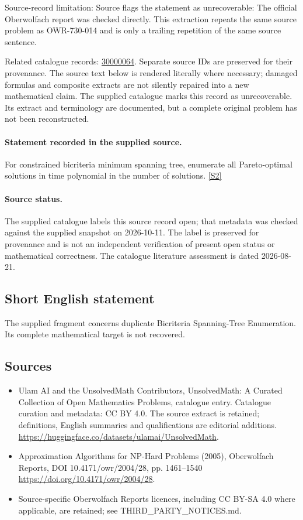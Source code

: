 \documentclass[11pt]{article}
\begin{document}
Source-record limitation: Source flags the statement as unrecoverable: The official Oberwolfach report was checked directly. This extraction repeats the same source problem as OWR-730-014 and is only a trailing repetition of the same source sentence.

Related catalogue records: \href{https://mehmetmars7.github.io/Erdosproblems-llm-hunter/problem.html?type=open_problems&id=30000064}{30000064}. Separate source IDs are preserved for their provenance.
The source text below is rendered literally where necessary; damaged formulas and composite extracts are not silently repaired into a new mathematical claim.
The supplied catalogue marks this record as unrecoverable. Its extract and terminology are documented, but a complete original problem has not been reconstructed.
\paragraph{Statement recorded in the supplied source.}
For constrained bicriteria minimum spanning tree, enumerate all Pareto-optimal solutions in time polynomial in the number of solutions. \href{https://doi.org/10.4171/owr/2004/28}{[S2]}
\paragraph{Source status.}
The supplied catalogue labels this source record open; that metadata was checked against the supplied snapshot on 2026-10-11. The label is preserved for provenance and is not an independent verification of present open status or mathematical correctness. The catalogue literature assessment is dated 2026-08-21.
\subsection{Short English statement}
The supplied fragment concerns duplicate Bicriteria Spanning-Tree Enumeration. Its complete mathematical target is not recovered.
\subsection{Sources}
\begin{itemize}
\item[S1] Ulam AI and the UnsolvedMath Contributors, UnsolvedMath: A Curated Collection of Open Mathematics Problems, catalogue entry. Catalogue curation and metadata: CC BY 4.0. The source extract is retained; definitions, English summaries and qualifications are editorial additions.
\url{https://huggingface.co/datasets/ulamai/UnsolvedMath}.
\item[S2] Approximation Algorithms for NP-Hard Problems (2005), Oberwolfach Reports, DOI 10.4171/owr/2004/28, pp. 1461--1540
\url{https://doi.org/10.4171/owr/2004/28}.
\item Source-specific Oberwolfach Reports licences, including CC BY-SA 4.0 where applicable, are retained; see THIRD\_PARTY\_NOTICES.md.
\end{itemize}
\end{document}
